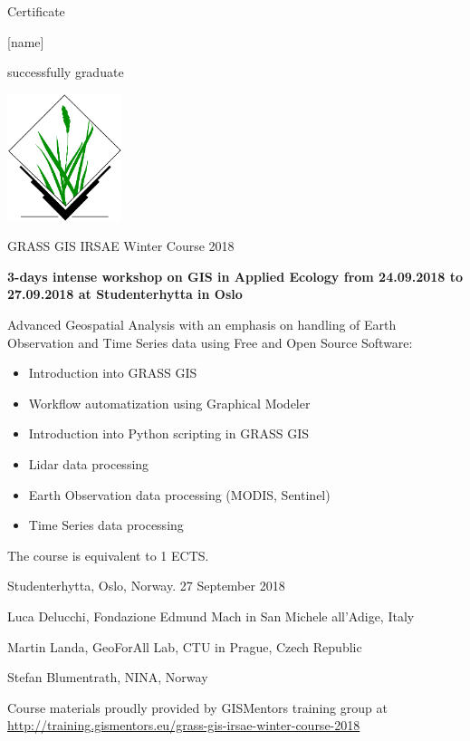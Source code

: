\documentclass[12pt, a4paper]{letter}
\begin{document}
\pagestyle{empty}
\begin{center}

{\Huge Certificate}

{\Large [name]}

successfully graduate

\includegraphics[width=0.25\textwidth]{./grasslogo_vector.pdf}

{\Large GRASS GIS IRSAE Winter Course 2018}

{\bf 3-days intense workshop on GIS in Applied Ecology from 24.09.2018 to
27.09.2018 at Studenterhytta in Oslo}
\end{center}

Advanced Geospatial Analysis with an emphasis on handling of Earth
Observation and Time Series data using Free and Open Source Software:

\begin{itemize}
    \item Introduction into GRASS GIS
    \item Workflow automatization using Graphical Modeler
    \item Introduction into Python scripting in GRASS GIS
    \item Lidar data processing
    \item Earth Observation data processing (MODIS, Sentinel)
    \item Time Series data processing
\end{itemize}

\vfill

The course is equivalent to 1 ECTS.

\vfill

    Studenterhytta, Oslo, Norway. 27 September 2018\\

\vfill

    Luca Delucchi, Fondazione Edmund Mach in San Michele all’Adige, Italy

\vfill
    
    Martin Landa, GeoForAll Lab, CTU in Prague, Czech Republic
    
\vfill

    Stefan Blumentrath, NINA, Norway \\

\vfill

\begin{center}
{\footnotesize Course materials proudly provided by GISMentors
  training group at
  \url{http://training.gismentors.eu/grass-gis-irsae-winter-course-2018}}
\end{center}
\end{document}
